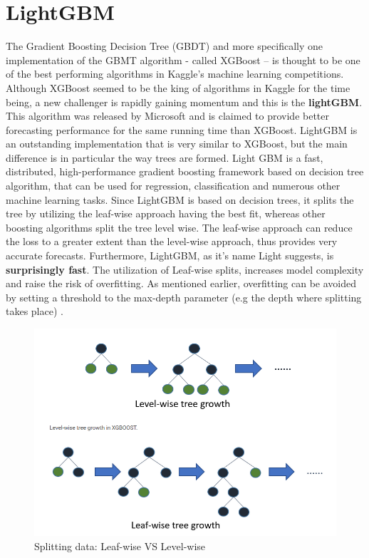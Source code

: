 \section{LightGBM}
The Gradient Boosting Decision Tree (GBDT) and more specifically one implementation of the GBMT algorithm - called XGBoost – is thought to be one of the best performing algorithms in Kaggle's machine learning competitions. Although XGBoost seemed to be the king of algorithms in Kaggle for the time being, a new challenger is rapidly gaining momentum and this is the \textbf{lightGBM}. This algorithm was released by Microsoft and is claimed to provide better forecasting performance for the same running time than XGBoost. LightGBM is an outstanding implementation that is very similar to XGBoost, but the main difference is in particular the way trees are formed. Light GBM is a fast, distributed, high-performance gradient boosting framework based on decision tree algorithm, that can be used for regression, classification and numerous other machine learning tasks. Since LightGBM is based on decision trees, it splits the tree by utilizing the leaf-wise approach having the best fit, whereas other boosting algorithms split the tree level wise. The leaf-wise approach can reduce the loss to a greater extent than the level-wise approach, thus provides very accurate forecasts. Furthermore, LightGBM, as it's name Light suggests, is \textbf{surprisingly fast}.
The utilization of Leaf-wise splits, increases model complexity and raise the risk of overfitting. As mentioned earlier, overfitting can be avoided by setting a threshold to the max-depth parameter (e.g the depth where splitting takes place) \cite{lfl}.

\begin{figure}[htbp]
\centering
\includegraphics[width=0.75\linewidth]{project/LightGBM.PNG}
\caption{ Splitting data: Leaf-wise VS Level-wise}

\end{figure}


